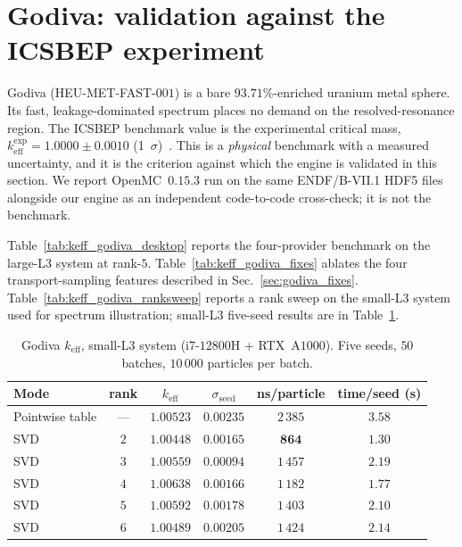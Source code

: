 \section{Godiva: validation against the ICSBEP experiment}
\label{sec:godiva}

Godiva (HEU-MET-FAST-$001$) is a bare $93.71\%$-enriched
uranium metal sphere. Its fast, leakage-dominated spectrum
places no demand on the resolved-resonance region. The
ICSBEP benchmark value is the experimental critical mass,
$k_\text{eff}^\text{exp} = 1.0000 \pm 0.0010$
(1~$\sigma$)~\cite{icsbep_hmf001}. This is a \emph{physical}
benchmark with a measured uncertainty, and it is the
criterion against which the engine is validated in this
section. We report OpenMC~$0.15.3$ run on the same
ENDF/B-VII.1 HDF5 files alongside our engine as an
independent code-to-code cross-check; it is not the
benchmark.

Table~\ref{tab:keff_godiva_desktop} reports the four-provider
benchmark on the large-L3 system at rank-$5$.
Table~\ref{tab:keff_godiva_fixes} ablates the four
transport-sampling features described in
Sec.~\ref{sec:godiva_fixes}.
Table~\ref{tab:keff_godiva_ranksweep} reports a rank sweep
on the small-L3 system used for spectrum illustration;
small-L3 five-seed results are in Table~\ref{tab:keff_godiva}.

\begin{table}[t]
\centering
\caption{Godiva $k_\text{eff}$, small-L3 system
(i$7$-$12800$H + RTX~A$1000$). Five seeds, $50$ batches,
$10\,000$ particles per batch.}
\label{tab:keff_godiva}
\begin{tabular}{@{}lccccc@{}}
\toprule
Mode & rank & $k_\text{eff}$ & $\sigma_\text{seed}$ & ns/particle & time/seed (s) \\
\midrule
Pointwise table & ---  & $1.00523$ & $0.00235$ & $2\,385$ & $3.58$ \\
SVD & $2$  & $1.00448$ & $0.00165$ & $\mathbf{864}$  & $\mathbf{1.30}$ \\
SVD & $3$  & $1.00559$ & $0.00094$ & $1\,457$ & $2.19$ \\
SVD & $4$  & $1.00638$ & $0.00166$ & $1\,182$ & $1.77$ \\
SVD & $5$  & $1.00592$ & $0.00178$ & $1\,403$ & $2.10$ \\
SVD & $6$  & $1.00489$ & $0.00205$ & $1\,424$ & $2.14$ \\
\bottomrule
\end{tabular}
\end{table}

